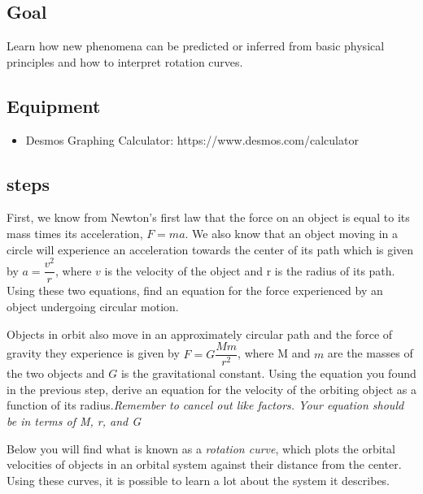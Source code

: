 \subsection{Goal}
Learn how new phenomena can be predicted or inferred from basic physical principles and how to interpret rotation curves. 

\subsection{Equipment}

\begin{itemize}
	\item Desmos Graphing Calculator: https://www.desmos.com/calculator
\end{itemize}

\subsection{steps}

\begin{steps}
	\item First, we know from Newton's first law that the force on an object is equal to its mass times its acceleration, $F=ma$. We also know that an object moving in a circle will experience an acceleration towards the center of its path which is given by $a = \dfrac{v^2}{r}$, where $v$ is the velocity of the object and r is the radius of its path. Using these two equations, find an equation for the force experienced by an object undergoing circular motion. 
	
	\item Objects in orbit also move in an approximately circular path and the force of gravity they experience is given by $F = G\dfrac{Mm}{r^2}$, where M and $m$ are the masses of the two objects and $G$ is the gravitational constant. Using the equation you found in the previous step, derive an equation for the velocity of the orbiting object as a function of its radius.\textit{Remember to cancel out like factors. Your equation should be in terms of M, r, and G}
\end{steps}

Below you will find what is known as a \textit{rotation curve}, which plots the orbital velocities of objects in an orbital system against their distance from the center. Using these curves, it is possible to learn a lot about the system it describes. 

